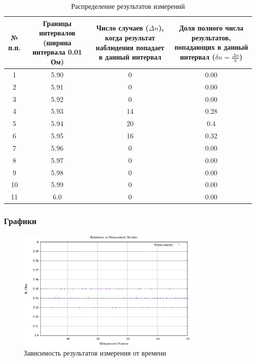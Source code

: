 \newpage
\begin{table}[h!]
\centering
\caption{Распределение результатов измерений}
\label{tab:distribution}
\begin{tabular}{|c|c|c|c|}
\hline
\begin{minipage}{7mm}
    № п.п. 
\end{minipage}&
\begin{minipage}{5cm}
    Границы интервалов (ширина интервала 0.01 Ом)
\end{minipage} &
\begin{minipage}{5cm}
    Число случаев ($\Delta n$), когда результат наблюдения попадает в данный интервал
\end{minipage} &
\begin{minipage}{5cm}
    Доля полного числа результатов, попадающих в данный интервал ($\delta n = \frac{\Delta n}{n}$)
\end{minipage}\\
\hline
1    & 5.90    & 0    & 0.00   \\
2    & 5.91   & 0   & 0.00    \\
3    & 5.92    & 0    & 0.00    \\
4    & 5.93    & 14   & 0.28    \\
5    & 5.94    & 20    & 0.4    \\
6    & 5.95    & 16    & 0.32    \\
7    & 5.96    & 0    & 0.00    \\
8    & 5.97    & 0    & 0.00    \\
9    & 5.98    & 0    & 0.00    \\
10   & 5.99    & 0    & 0.00    \\
11   & 6.0   & 0    & 0.00    \\
\hline
\end{tabular}
\end{table}

\newpage

\subsubsection{Графики}


\begin{figure}[ht!]
\centering
\includegraphics[width=0.8\textwidth]{resistance_plot}
\caption{Зависимость результатов измерения от времени}
\label{fig:plot}
\end{figure}

